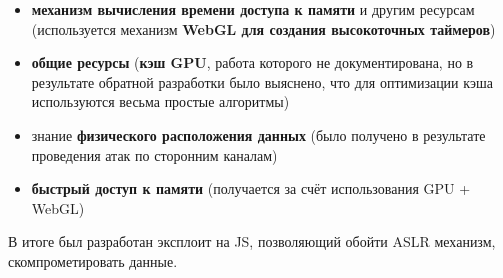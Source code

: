 \begin{frame}{\insertsubsection}
{    \begin{itemize}
    \item \textbf{механизм вычисления времени доступа к памяти} и другим
      ресурсам (используется механизм \textbf{WebGL для создания высокоточных
        таймеров})
    \item \textbf{общие ресурсы} (\textbf{кэш GPU}, работа которого не
      документирована, но в результате обратной разработки было выяснено, что
      для оптимизации кэша используются весьма простые алгоритмы)
    \item знание \textbf{физического расположения данных} (было получено в
      результате проведения атак по сторонним каналам)
    \item \textbf{быстрый доступ к памяти} (получается за счёт использования
      GPU + WebGL)
    \end{itemize}

    В итоге был разработан эксплоит на JS, позволяющий обойти ASLR механизм,
    скомпрометировать данные.

  }
\end{frame}